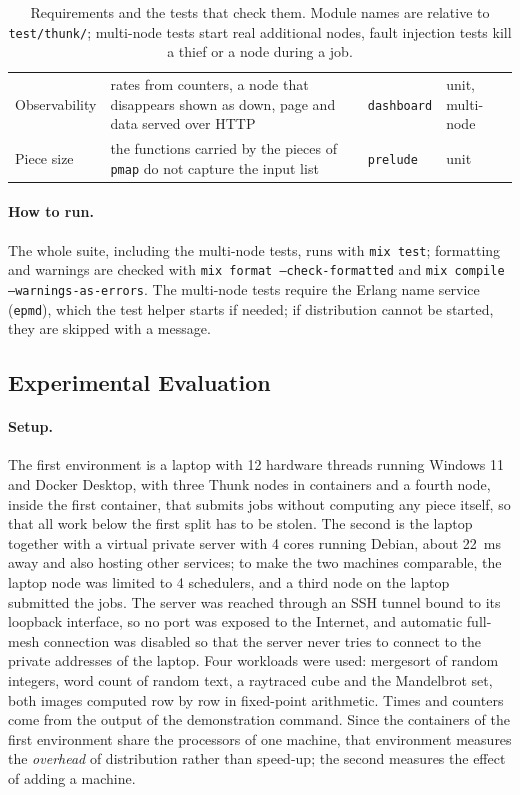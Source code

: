 \documentclass{scrartcl}
\begin{document}
\begin{table}
\begin{tabularx}{\textwidth}{@{}l>{\hsize}Y>{\hsize}Y>{\hsize}Y@{}}
    Observability & rates from counters, a node that disappears shown as down, page and data served over HTTP & \texttt{dashboard} & unit, multi-node \\
    Piece size & the functions carried by the pieces of \texttt{pmap} do not capture the input list & \texttt{prelude} & unit \\
    \bottomrule
  \end{tabularx}
  \caption{Requirements and the tests that check them. Module names are relative to \texttt{test/thunk/}; multi-node tests start real additional nodes, fault injection tests kill a thief or a node during a job.}
  \label{tab:tests}
\end{table}

\paragraph{How to run.}
The whole suite, including the multi-node tests, runs with \texttt{mix test}; formatting and warnings are checked with \texttt{mix format --check-formatted} and \texttt{mix compile --warnings-as-errors}.
%
The multi-node tests require the Erlang name service (\texttt{epmd}), which the test helper starts if needed; if distribution cannot be started, they are skipped with a message.

\subsection{Experimental Evaluation}\label{sec:experiments}

\paragraph{Setup.}
The first environment is a laptop with 12 hardware threads running Windows 11 and Docker Desktop, with three Thunk nodes in containers and a fourth node, inside the first container, that submits jobs without computing any piece itself, so that all work below the first split has to be stolen.
%
The second is the laptop together with a virtual private server with 4 cores running Debian, about 22~ms away and also hosting other services; to make the two machines comparable, the laptop node was limited to 4 schedulers, and a third node on the laptop submitted the jobs.
%
The server was reached through an SSH tunnel bound to its loopback interface, so no port was exposed to the Internet, and automatic full-mesh connection was disabled so that the server never tries to connect to the private addresses of the laptop.
%
Four workloads were used: mergesort of random integers, word count of random text, a raytraced cube and the Mandelbrot set, both images computed row by row in fixed-point arithmetic.
%
Times and counters come from the output of the demonstration command.
%
Since the containers of the first environment share the processors of one machine, that environment measures the \emph{overhead} of distribution rather than speed-up; the second measures the effect of adding a machine.
\end{document}
